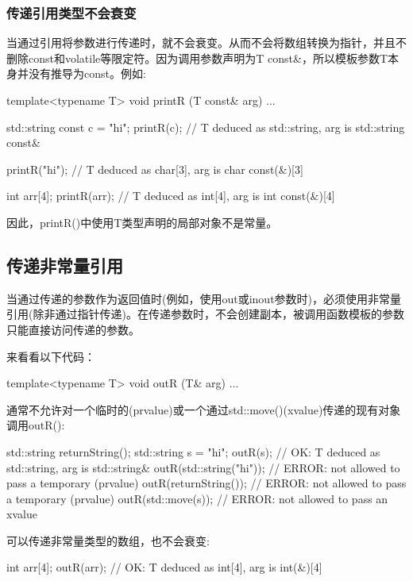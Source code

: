 \subsubsection{传递引用类型不会衰变}

当通过引用将参数进行传递时，就不会衰变。从而不会将数组转换为指针，并且不删除const和volatile等限定符。因为调用参数声明为T const\&，所以模板参数T本身并没有推导为const。例如:

\begin{cpp}
template<typename T>
void printR (T const& arg) {
	...
}

std::string const c = "hi";
printR(c); // T deduced as std::string, arg is std::string const&

printR("hi"); // T deduced as char[3], arg is char const(&)[3]

int arr[4];
printR(arr); // T deduced as int[4], arg is int const(&)[4]
\end{cpp}

因此，printR()中使用T类型声明的局部对象不是常量。

\subsection{传递非常量引用}

当通过传递的参数作为返回值时(例如，使用out或inout参数时)，必须使用非常量引用(除非通过指针传递)。在传递参数时，不会创建副本，被调用函数模板的参数只能直接访问传递的参数。

来看看以下代码：

\begin{cpp}
template<typename T>
void outR (T& arg) {
	...
}
\end{cpp}

通常不允许对一个临时的(prvalue)或一个通过std::move()(xvalue)传递的现有对象调用outR():

\begin{cpp}
std::string returnString();
std::string s = "hi";
outR(s); // OK: T deduced as std::string, arg is std::string&
outR(std::string("hi")); // ERROR: not allowed to pass a temporary (prvalue)
outR(returnString()); // ERROR: not allowed to pass a temporary (prvalue)
outR(std::move(s)); // ERROR: not allowed to pass an xvalue
\end{cpp}

可以传递非常量类型的数组，也不会衰变:

\begin{cpp}
int arr[4];
outR(arr); // OK: T deduced as int[4], arg is int(&)[4]
\end{cpp}

